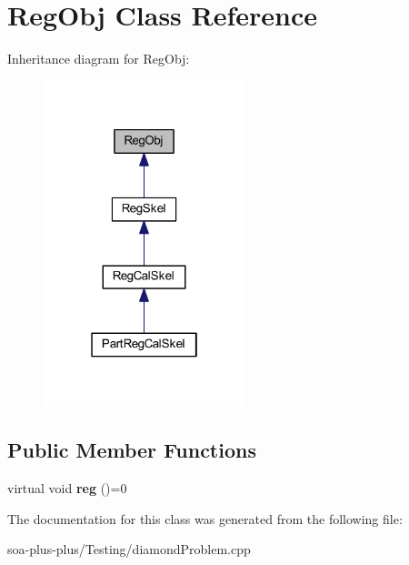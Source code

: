 \hypertarget{class_reg_obj}{
\section{RegObj Class Reference}
\label{class_reg_obj}
}


Inheritance diagram for RegObj:\nopagebreak
\begin{figure}[H]
\begin{center}
\leavevmode
\includegraphics[width=166pt]{class_reg_obj__inherit__graph}
\end{center}
\end{figure}
\subsection*{Public Member Functions}
\begin{DoxyCompactItemize}
\item 
\hypertarget{class_reg_obj_a45ee474d5230b6dcf009acea1efd30d8}{
virtual void {\bfseries reg} ()=0}
\label{class_reg_obj_a45ee474d5230b6dcf009acea1efd30d8}

\end{DoxyCompactItemize}


The documentation for this class was generated from the following file:\begin{DoxyCompactItemize}
\item 
soa-\/plus-\/plus/Testing/diamondProblem.cpp\end{DoxyCompactItemize}
